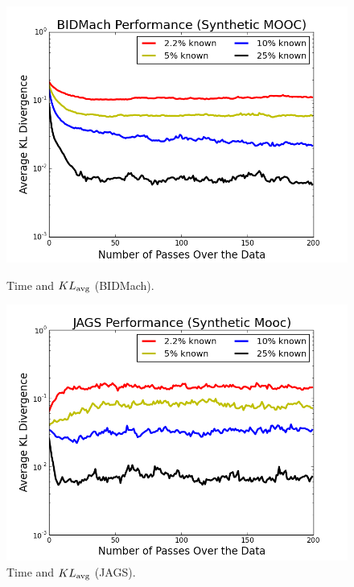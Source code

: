 \documentclass{article} %
\begin{document}
\begin{figure}[t]
  \centering
  \begin{minipage}{.5\textwidth}
    \centering
    \includegraphics[width=1\textwidth]{fig_diff_sparsity_bidmach}
    \caption{Time and $KL_{\rm avg}$ (BIDMach).}
    \label{fig:kl_time_bidmach}
  \end{minipage}\hfill
    \begin{minipage}{.5\textwidth}
    \centering
    \includegraphics[width=1\textwidth]{fig_diff_sparsity_jags}
    \caption{Time and $KL_{\rm avg}$ (JAGS).}
    \label{fig:kl_time_jags}
  \end{minipage}
\end{figure}
\end{document}
